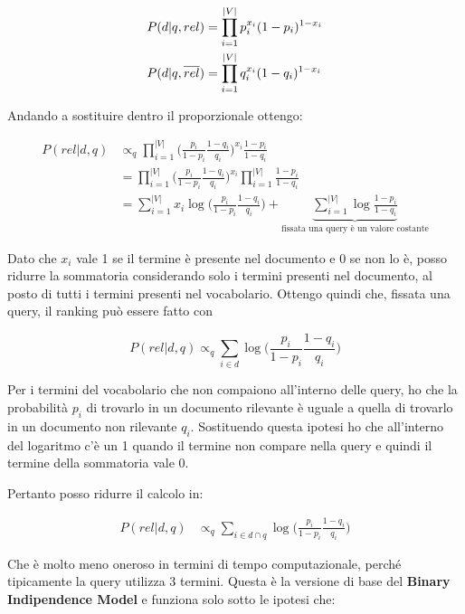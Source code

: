 \begin{align*}
P(d|q,rel) &= \prod\limits_{i = 1}^{|V|} p_{i}^{x_i}(1 - p_i)^{1-x_i} \\
P(d|q,\overline{rel}) &= \prod\limits_{i = 1}^{|V|} q_i^{x_i}(1 - q_i)^{1-x_i}
\end{align*}


\noindent Andando a sostituire dentro il proporzionale ottengo:

\begin{align*}
P(rel|d,q) &\propto_q \prod\limits_{i = 1}^{|V|} \Bigg(\frac{p_i}{1-p_i} \frac{1-q_i}{q_i}\Bigg)^{x_i} \frac{1-p_i}{1-q_i} \\
		   &= \prod\limits_{i = 1}^{|V|} \Bigg(\frac{p_i}{1-p_i} \frac{1-q_i}{q_i}\Bigg)^{x_i} \prod\limits_{i = 1}^{|V|} \frac{1-p_i}{1-q_i} \\
		   &= \sum\limits_{i = 1}^{|V|} x_i \log\Bigg(\frac{p_i}{1-p_i} \frac{1-q_i}{q_i}\Bigg) + \underbrace{\sum\limits_{i = 1}^{|V|} \log\frac{1-p_i}{1-q_i}}_{\text{fissata una query è un valore costante}}
\end{align*}


Dato che $x_i$ vale 1 se il termine è presente nel documento e 0 se non lo è, posso ridurre la sommatoria considerando solo i termini presenti nel documento, al posto di tutti i termini presenti nel vocabolario. 
Ottengo quindi che, fissata una query, il ranking può essere fatto con 

$$
\boxed{P(rel|d,q) \propto_q \sum\limits_{i \in d} \log\Bigg(\frac{p_i}{1-p_i} \frac{1-q_i}{q_i}\Bigg)}
$$

\noindent Per i termini del vocabolario che non compaiono all'interno delle query, ho che la probabilità $p_i$ di trovarlo in un documento rilevante è uguale a quella di trovarlo in un documento non rilevante $q_i$.
Sostituendo questa ipotesi ho che all'interno del logaritmo c'è un 1 quando il termine non compare nella query e quindi il termine della sommatoria vale 0.

Pertanto posso ridurre il calcolo in:

\begin{align*}
P(rel|d,q) &\propto_q \sum\limits_{i \in d \cap q} \log \bigg( \frac{p_i}{1-p_i} \frac{1-q_i}{q_i} \bigg)
\end{align*}

\noindent Che è molto meno oneroso in termini di tempo computazionale, perché tipicamente la query utilizza 3 termini.
Questa è la versione di base del \textbf{Binary Indipendence Model} e funziona solo sotto le ipotesi che:

